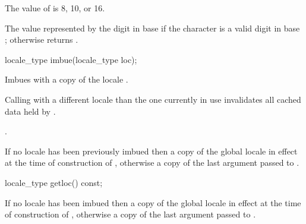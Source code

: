 \begin{itemdescr}
\pnum
\expects
The value of  is 8, 10, or 16.

\pnum
\returns
The value represented by the digit  in base
 if the character  is a valid digit in base
; otherwise returns .
\end{itemdescr}

%
%
\begin{itemdecl}
locale_type imbue(locale_type loc);
\end{itemdecl}

\begin{itemdescr}
\pnum
\effects
Imbues  with a copy of the
locale .
\begin{note}
Calling  with a
different locale than the one currently in use invalidates all cached
data held by .
\end{note}

\pnum
\ensures
{}.

\pnum
\returns
If no locale has been previously imbued then a copy of the
global locale in effect at the time of construction of ,
otherwise a copy of the last argument passed to .
\end{itemdescr}

%
%
\begin{itemdecl}
locale_type getloc() const;
\end{itemdecl}

\begin{itemdescr}
\pnum
\returns
If no locale has been imbued then a copy of the global locale
in effect at the time of construction of , otherwise a copy of
the last argument passed to .
\end{itemdescr}

